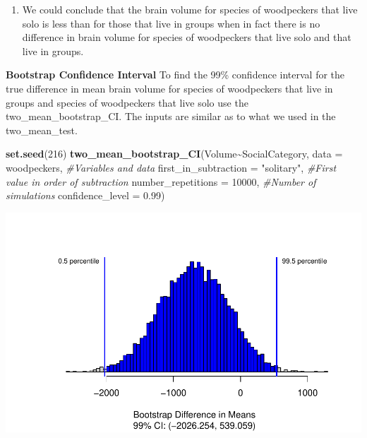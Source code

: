 \documentclass[
]{report}
\newenvironment{Shaded}{\begin{snugshade}}{\end{snugshade}}
\newcommand{\AttributeTok}[1]{\textcolor[rgb]{0.13,0.29,0.53}{#1}}
\newcommand{\CommentTok}[1]{\textcolor[rgb]{0.56,0.35,0.01}{\textit{#1}}}
\newcommand{\DecValTok}[1]{\textcolor[rgb]{0.00,0.00,0.81}{#1}}
\newcommand{\FloatTok}[1]{\textcolor[rgb]{0.00,0.00,0.81}{#1}}
\newcommand{\FunctionTok}[1]{\textcolor[rgb]{0.13,0.29,0.53}{\textbf{#1}}}
\newcommand{\NormalTok}[1]{#1}
\newcommand{\SpecialCharTok}[1]{\textcolor[rgb]{0.81,0.36,0.00}{\textbf{#1}}}
\newcommand{\StringTok}[1]{\textcolor[rgb]{0.31,0.60,0.02}{#1}}
\providecommand{\tightlist}{%
  \setlength{\itemsep}{0pt}\setlength{\parskip}{0pt}}
\begin{document}
\vspace{0.5in}

\begin{enumerate}
\def\labelenumi{\Alph{enumi}.}
\setcounter{enumi}{3}
\tightlist
\item
  We could conclude that the brain volume for species of woodpeckers that live solo is less than for those that live in groups when in fact there is no difference in brain volume for species of woodpeckers that live solo and that live in groups.
\end{enumerate}

\vspace{0.5in}

\textbf{Bootstrap Confidence Interval}
To find the 99\% confidence interval for the true difference in mean brain volume for species of woodpeckers that live in groups and species of woodpeckers that live solo use the two\_mean\_bootstrap\_CI. The inputs are similar as to what we used in the two\_mean\_test.

\begin{Shaded}
\begin{Highlighting}[]
\FunctionTok{set.seed}\NormalTok{(}\DecValTok{216}\NormalTok{)}
\FunctionTok{two\_mean\_bootstrap\_CI}\NormalTok{(Volume}\SpecialCharTok{\textasciitilde{}}\NormalTok{SocialCategory, }\AttributeTok{data =}\NormalTok{ woodpeckers,  }\CommentTok{\#Variables and data}
                      \AttributeTok{first\_in\_subtraction =} \StringTok{"solitary"}\NormalTok{, }\CommentTok{\#First value in order of subtraction}
                      \AttributeTok{number\_repetitions =} \DecValTok{10000}\NormalTok{,  }\CommentTok{\#Number of simulations}
                      \AttributeTok{confidence\_level =} \FloatTok{0.99}\NormalTok{)}
\end{Highlighting}
\end{Shaded}

\begin{center}\includegraphics[width=0.7\linewidth]{14-UR-module12_review_files/figure-latex/unnamed-chunk-4-1} \end{center}
\end{document}
